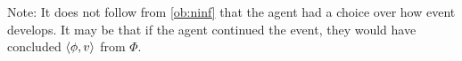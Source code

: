 \begin{note}
  Note:
  It does not follow from \autoref{ob:ninf} that the agent had a choice over how event develops.
  It may be that if the agent continued the event, they would have concluded \(\langle \phi, v \rangle\) from \(\Phi\).
\end{note}





\section{}
\label{cha:requs:sec:definition}

